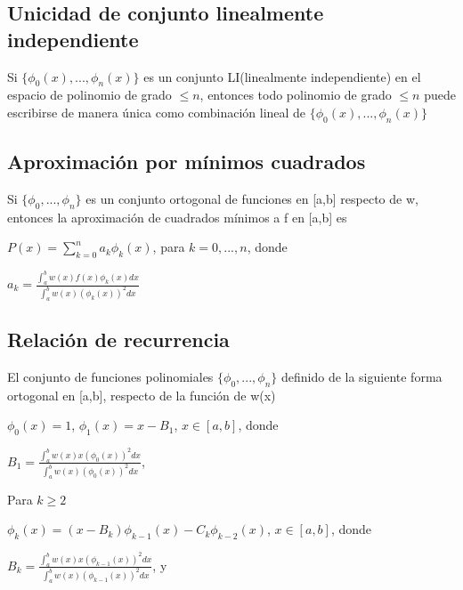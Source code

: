 \documentclass{article}
\begin{document}
 \vspace{5mm}

 \subsection{Unicidad  de conjunto linealmente independiente}\label{Metodo-Newton-Global}

Si $\{ \phi_0(x),...,\phi_n(x) \}$ es un conjunto LI(linealmente independiente) en el espacio de polinomio de
grado $\leq n$, entonces todo polinomio de grado $\leq n$ puede escribirse de manera única como combinación lineal
de $\{ \phi_0(x),...,\phi_n(x) \}$

 \vspace{5mm}

 \subsection{Aproximación por mínimos cuadrados}\label{Metodo-Newton-Global}

Si $\{ \phi_0,...,\phi_n \}$ es un conjunto ortogonal de funciones en [a,b] respecto de w,
entonces la aproximación de cuadrados mínimos a f en [a,b] es

$P(x) = \sum\limits_{k=0}^n a_k\phi_k(x)$, para $k = 0,...,n$, donde

$a_k = \frac{\displaystyle\int_{a}^{b}w(x)f(x)\phi_k(x)dx}{\displaystyle\int_{a}^{b}w(x)(\phi_k(x))^2dx}$

 \vspace{5mm}

 \subsection{Relación de recurrencia}\label{Metodo-Newton-Global}

 El conjunto de funciones polinomiales $\{ \phi_0,...,\phi_n \}$ definido de la siguiente forma ortogonal
 en [a,b], respecto de la función de w(x)

 $\phi_0(x) = 1 $, $\phi_1(x) = x -B_1$, $x \in [a,b]$, donde

 $B_1 = \frac{\displaystyle\int_{a}^{b}w(x)x(\phi_0(x))^2dx}{\displaystyle\int_{a}^{b}w(x)(\phi_0(x))^2dx}$,

  \vspace{5mm}

 Para $k \geq 2$

 $\phi_k(x) = (x-B_k)\phi_{k-1}(x)-C_k\phi_{k-2}(x)$, $x \in [a,b]$, donde

$B_k = \frac{\displaystyle\int_{a}^{b}w(x)x(\phi_{k-1}(x))^2dx}{\displaystyle\int_{a}^{b}w(x)(\phi_{k-1}(x))^2dx}$, y
\end{document}
